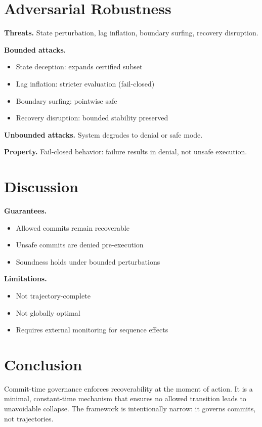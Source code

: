 \documentclass{article}
\begin{document}
\section{Adversarial Robustness}

\textbf{Threats.}
State perturbation, lag inflation, boundary surfing, recovery disruption.

\textbf{Bounded attacks.}
\begin{itemize}
    \item State deception: expands certified subset
    \item Lag inflation: stricter evaluation (fail-closed)
    \item Boundary surfing: pointwise safe
    \item Recovery disruption: bounded stability preserved
\end{itemize}

\textbf{Unbounded attacks.}
System degrades to denial or safe mode.

\textbf{Property.}
Fail-closed behavior: failure results in denial, not unsafe execution.

\section{Discussion}

\textbf{Guarantees.}
\begin{itemize}
    \item Allowed commits remain recoverable
    \item Unsafe commits are denied pre-execution
    \item Soundness holds under bounded perturbations
\end{itemize}

\textbf{Limitations.}
\begin{itemize}
    \item Not trajectory-complete
    \item Not globally optimal
    \item Requires external monitoring for sequence effects
\end{itemize}

\section{Conclusion}

Commit-time governance enforces recoverability at the moment of action. It is a minimal, constant-time mechanism that ensures no allowed transition leads to unavoidable collapse. The framework is intentionally narrow: it governs commits, not trajectories.
\end{document}
